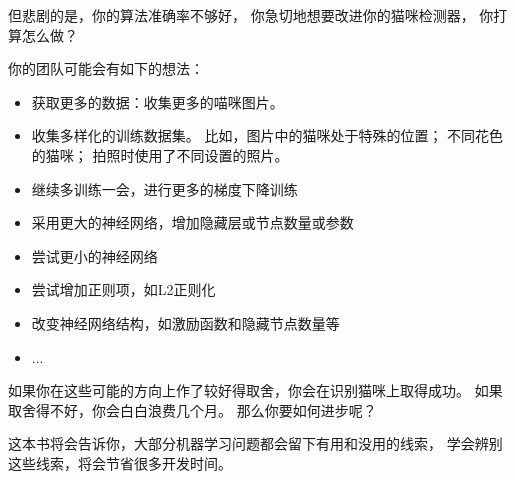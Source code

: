 但悲剧的是，你的算法准确率不够好，
你急切地想要改进你的猫咪检测器，
你打算怎么做？

你的团队可能会有如下的想法：
\begin{itemize}
	\item 获取更多的数据：收集更多的喵咪图片。
	\item 收集多样化的训练数据集。
	比如，图片中的猫咪处于特殊的位置；
	不同花色的猫咪；
	拍照时使用了不同设置的照片。
	\item 继续多训练一会，进行更多的梯度下降训练
	\item 采用更大的神经网络，增加隐藏层或节点数量或参数
	\item 尝试更小的神经网络
	\item 尝试增加正则项，如L2正则化
	\item 改变神经网络结构，如激励函数和隐藏节点数量等
	\item ...
	
\end{itemize}

如果你在这些可能的方向上作了较好得取舍，你会在识别猫咪上取得成功。
如果取舍得不好，你会白白浪费几个月。
那么你要如何进步呢？

这本书将会告诉你，大部分机器学习问题都会留下有用和没用的线索，
学会辨别这些线索，将会节省很多开发时间。


